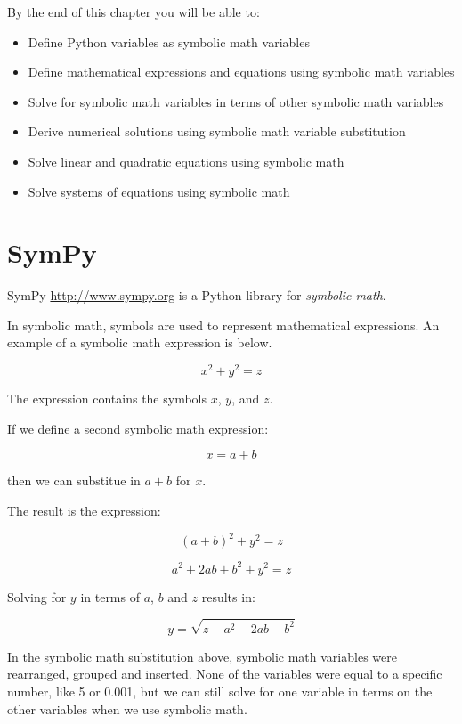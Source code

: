 \documentclass{book}
\begin{document}
    
        By the end of this chapter you will be able to:

\begin{itemize}
\item
  Define Python variables as symbolic math variables
\item
  Define mathematical expressions and equations using symbolic math
  variables
\item
  Solve for symbolic math variables in terms of other symbolic math
  variables
\item
  Derive numerical solutions using symbolic math variable substitution
\item
  Solve linear and quadratic equations using symbolic math
\item
  Solve systems of equations using symbolic math
\end{itemize}
        \newpage

    




    
        \hypertarget{sympy}{%
\section{SymPy}\label{sympy}}
    




    
        SymPy \url{http://www.sympy.org} is a Python library for \emph{symbolic
math}.

In symbolic math, symbols are used to represent mathematical
expressions. An example of a symbolic math expression is below.

\[ x^{2} + y^{2} = z \]

The expression contains the symbols \(x\), \(y\), and \(z\).

If we define a second symbolic math expression:

\[ x = a + b \]

then we can substitue in \(a + b\) for \(x\).

The result is the expression:

\[ (a + b)^{2} + y^{2} = z \]

\[ a^{2} + 2ab + b^{2} + y^{2} = z \]

Solving for \(y\) in terms of \(a\), \(b\) and \(z\) results in:

\[ y = \sqrt{z - a^{2} - 2ab - b^{2}} \]

In the symbolic math substitution above, symbolic math variables were
rearranged, grouped and inserted. None of the variables were equal to a
specific number, like 5 or 0.001, but we can still solve for one
variable in terms on the other variables when we use symbolic math.
    
\end{document}

